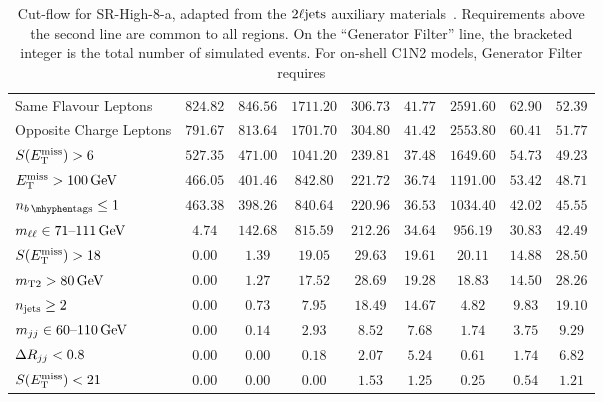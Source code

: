 \begin{sidewaystable}[tp]
{\begin{tabular}{lcccccccc}
Same Flavour Leptons                                       & $824.82$ & $846.56$ & $1711.20$ & $306.73$ & $41.77$ & $2591.60$ & $62.90$ & $52.39$ \\
Opposite Charge Leptons                                   & $791.67$ & $813.64$ & $1701.70$ & $304.80$ & $41.42$ & $2553.80$ & $60.41$ & $51.77$ \\
$\metsig > 6$                                               & $527.35$ & $471.00$ & $1041.20$ & $239.81$ & $37.48$ & $1649.60$ & $54.73$ & $49.23$ \\
$\met > 100\,\eV[G]$                                           & $466.05$ & $401.46$ & $842.80$ & $221.72$ & $36.74$ & $1191.00$ & $53.42$ & $48.71$ \\
\hline
$\nbtag \leq 1$                                          & $463.38$ & $398.26$ & $840.64$ & $220.96$ & $36.53$ & $1034.40$ & $42.02$ & $45.55$ \\
$\mll \in 71\textrm{--}111\,\eV[G]$                            & $4.74$ & $142.68$ & $815.59$ & $212.26$ & $34.64$ & $956.19$ & $30.83$ & $42.49$ \\
$\metsig > 18$                                            & $0.00$ & $1.39$ & $19.05$ & $29.63$ & $19.61$ & $20.11$ & $14.88$ & $28.50$ \\
$\mttwo > 80\,\eV[G]$                                        & $0.00$ & $1.27$ & $17.52$ & $28.69$ & $19.28$ & $18.83$ & $14.50$ & $28.26$ \\
$\njet \geq 2$                               & $0.00$ & $0.73$ & $7.95$ & $18.49$ & $14.67$ & $4.82$ & $9.83$ & $19.10$ \\
$\mjj \in 60\text{--}110\,\eV[G]$                            & $0.00$ & $0.14$ & $2.93$ & $8.52$ & $7.68$ & $1.74$ & $3.75$ & $9.29$ \\
$\rjj < 0.8$                                              & $0.00$ & $0.00$ & $0.18$ & $2.07$ & $5.24$ & $0.61$ & $1.74$ & $6.82$ \\
$\metsig < 21$                                            & $0.00$ & $0.00$ & $0.00$ & $1.53$ & $1.25$ & $0.25$ & $0.54$ & $1.21$ \\
\end{tabular}
}
\caption[
Cut-flow for SR-High-8-a
]{%
Cut-flow for SR-High-8-a,
adapted from the $\twoljets$ auxiliary materials~\cite{hepdata.116034}.
Requirements above the second line are common to all regions.
On the ``Generator Filter'' line, the bracketed integer is the total number of
simulated events.
For on-shell C1N2 models, Generator Filter requires
}
\end{sidewaystable}
